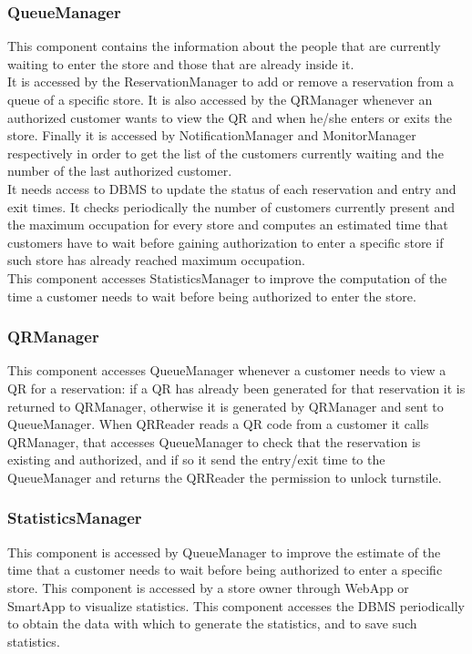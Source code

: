 \subsubsection{QueueManager}
This component contains the information about the people that are currently waiting to enter the store and those that are already inside it.\\
It is accessed by the ReservationManager to add or remove a reservation from a queue of a specific store.
It is also accessed by the QRManager whenever an authorized customer wants to view the QR and when he/she enters or exits the store.
Finally it is accessed by NotificationManager and MonitorManager respectively in order to get the list of the customers currently waiting and the number of the last authorized customer.\\
It needs access to DBMS to update the status of each reservation and entry and exit times. It checks periodically the number of customers currently present and the maximum occupation for every store and computes an estimated time that customers have to wait before gaining authorization to enter a specific store if such store has already reached maximum occupation.\\
This component accesses StatisticsManager to improve the computation of the time a customer needs to wait before being authorized to enter the store.
\subsubsection{QRManager}
This component accesses QueueManager whenever a customer needs to view a QR for a reservation: if a QR has already been generated for that reservation it is returned to QRManager, otherwise it is generated by QRManager and sent to QueueManager. When QRReader reads a QR code from a customer it calls QRManager, that accesses QueueManager to check that the reservation is existing and authorized, and if so it send the entry/exit time to the QueueManager and returns the QRReader the permission to unlock turnstile.
\subsubsection{StatisticsManager}
This component is accessed by QueueManager to improve the estimate of the time that a customer needs to wait before being authorized to enter a specific store. This component is accessed by a store owner through WebApp or SmartApp to visualize statistics. This component accesses the DBMS periodically to obtain the data with which to generate the statistics, and to save such statistics.
